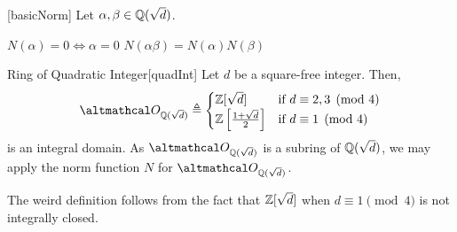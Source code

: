 \documentclass[../modern_algebra_2.tex]{subfiles}
\begin{document}
\begin{Theorem}{}[basicNorm]
    Let \(\alpha, \beta \in \QQ(\sqrt{d})\).
    \begin{enumerate}[label=(\roman*), ref=\protect{\Cref{th:basicNorm} (\roman*)}]
        \ii\label{itm:basicNorm.i}
        \(N(\alpha) = 0 \iff \alpha = 0\)
        \ii\label{itm:basicNorm.ii}
        \(N(\alpha \beta) = N(\alpha)N(\beta)\)
    \end{enumerate}
\end{Theorem}

\begin{Definition}{Ring of Quadratic Integer}[quadInt]
    Let \(d\) be a square-free integer. Then,
    \[
        \mcal{O}_{\QQ(\sqrt{d})} \triangleq \begin{cases}
            \ZZ{}[\sqrt{d}] & \text{if}~d \equiv 2, 3 \pmod{4} \\
            \ZZ{} \left[\frac{1+\sqrt{d}}{2}\right] & \text{if}~d \equiv 1 \pmod{4}
        \end{cases}
    \]
    is an integral domain.
    As \(\mcal{O}_{\QQ(\sqrt{d})}\) is a subring of \(\QQ(\sqrt{d})\),
    we may apply the norm function \(N\) for \(\mcal{O}_{\QQ(\sqrt{d})}\).
\end{Definition}

\begin{note}
    The weird definition follows from the fact that
    \(\ZZ{}[\sqrt{d}]\) when \(d \equiv 1 \pmod{4}\) is not integrally closed.
\end{note}
\end{document}
